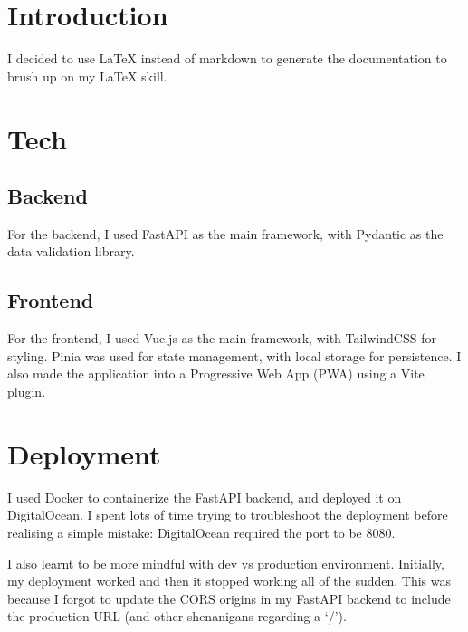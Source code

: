 \documentclass{article}
\begin{document}
\section{Introduction}
I decided to use LaTeX instead of markdown to generate the documentation to brush up on my LaTeX skill.

\section{Tech}
\subsection{Backend}
For the backend, I used FastAPI as the main framework, with Pydantic as the data validation library.

\subsection{Frontend}
For the frontend, I used Vue.js as the main framework, with TailwindCSS for styling. Pinia was used for state management, with local storage for persistence. I also made the application into a Progressive Web App (PWA) using a Vite plugin.

\section{Deployment}
I used Docker to containerize the FastAPI backend, and deployed it on DigitalOcean. I spent lots of time trying to troubleshoot the deployment before realising a simple mistake: DigitalOcean required the port to be 8080.

I also learnt to be more mindful with dev vs production environment. Initially, my deployment worked and then it stopped working all of the sudden. This was because I forgot to update the CORS origins in my FastAPI backend to include the production URL (and other shenanigans regarding a `/').
\end{document}

